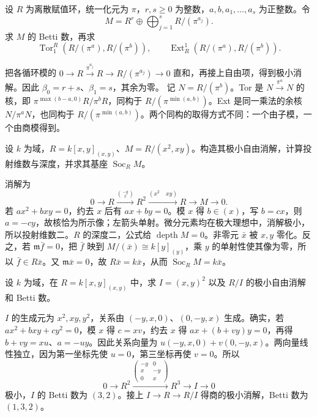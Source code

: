 \begin{exercise}\label{b3:ex:17-dvr-betti}
	设 \(R\) 为离散赋值环，统一化元为 \(\pi\)，\(r,s\ge0\) 为整数，\(a,b,a_1,\ldots,a_s\) 为正整数。令
	\[
		M=R^r\oplus\bigoplus_{j=1}^sR/(\pi^{a_j}).
	\]
	求 \(M\) 的 Betti 数，再求
	\[
		\operatorname{Tor}_1^R(R/(\pi^a),R/(\pi^b)),\qquad \operatorname{Ext}_R^1(R/(\pi^a),R/(\pi^b)).
	\]
\end{exercise}
\begin{solution}
	把各循环模的 \(0\to R\xrightarrow{\pi^{a_j}}R\to R/(\pi^{a_j})\to0\) 直和，再接上自由项，得到极小消解。因此 \(\beta_0=r+s\)、\(\beta_1=s\)，其余为零。 记 \(N=R/(\pi^b)\)。Tor 是 \(N\xrightarrow{\pi^a}N\) 的核，即 \(\pi^{\max(b-a,0)}R/\pi^bR\)，同构于 \(R/(\pi^{\min(a,b)})\)。Ext 是同一乘法的余核 \(N/\pi^aN\)，也同构于 \(R/(\pi^{\min(a,b)})\)。两个同构的取得方式不同：一个由子模，一个由商模得到。
\end{solution}

\begin{exercise}\label{b3:ex:17-embedded-point-resolution}
	设 \(k\) 为域，\(R=k[x,y]_{(x,y)}\)、\(M=R/(x^2,xy)\)。构造其极小自由消解，计算投射维数与深度，并求其基座 \(\operatorname{Soc}_RM\)。
\end{exercise}
\begin{solution}
	消解为
	\[
		0\to R\xrightarrow{\binom{-y}{x}}R^2 \xrightarrow{(x^2\quad xy)}R\to M\to0.
	\]
	若 \(ax^2+bxy=0\)，约去 \(x\) 后有 \(ax+by=0\)。模 \(x\) 得 \(b\in(x)\)，写 \(b=cx\)，则 \(a=-cy\)，故核恰为所示像；左箭头单射。微分元素均在极大理想中，消解极小，所以投射维数二。\(R\) 的深度二，公式给 \(\operatorname{depth}M=0\)。非零元 \(\bar x\) 被 \(x,y\) 零化。反之，若 \(\mathfrak m\bar f=0\)，把 \(\bar f\) 映到 \(M/(\bar x)\cong k[y]_{(y)}\)，乘 \(y\) 的单射性使其像为零，所以 \(\bar f\in R\bar x\)。又 \(\mathfrak m\bar x=0\)，故 \(R\bar x=k\bar x\)，从而 \(\operatorname{Soc}_RM=k\bar x\)。
\end{solution}

\begin{exercise}\label{b3:ex:17-square-maximal-ideal}
	设 \(k\) 为域，在 \(R=k[x,y]_{(x,y)}\) 中，求 \(I=(x,y)^2\) 以及 \(R/I\) 的极小自由消解和 Betti 数。
\end{exercise}
\begin{solution}
	\(I\) 的生成元为 \(x^2,xy,y^2\)，关系由 \((-y,x,0)\)、\((0,-y,x)\) 生成。确实，若 \(ax^2+bxy+cy^2=0\)，模 \(x\) 得 \(c=xv\)，约去 \(x\) 得 \(ax+(b+vy)y=0\)，再得 \(b+vy=xu\)、\(a=-uy\)。因此关系向量为 \(u(-y,x,0)+v(0,-y,x)\)。两向量线性独立，因为第一坐标先使 \(u=0\)，第三坐标再使 \(v=0\)。所以
	\[
		0\to R^2\xrightarrow{\left(\begin{smallmatrix}-y&0\\x&-y\\0&x\end{smallmatrix}\right)}R^3\to I\to0
	\]
	极小，\(I\) 的 Betti 数为 \((3,2)\)。接上 \(I\to R\to R/I\) 得商的极小消解，Betti 数为 \((1,3,2)\)。
\end{solution}

